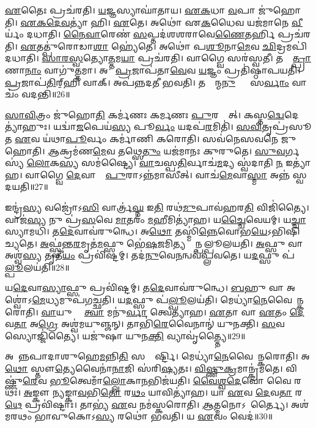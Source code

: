 \ul{𑌏}𑌤𑍈𑌃 𑌪𑍍𑌰𑌚॑𑌰𑌤𑌿।
\ul{𑌯}𑌜𑍍𑌞𑌸𑍍𑌯𑌾𑌘𑌾॑𑌤𑌾𑌯।
\ul{𑌏}\ul{𑌕}𑌧𑌾 \ul{𑌵}𑌪𑌾 𑌜𑍁॑𑌹𑍋𑌤𑌿।
\ul{𑌏}\ul{𑌕}\ul{𑌦𑍇}\ul{𑌵}𑌤𑍍𑌯𑌾॑ 𑌹𑌿।
\ul{𑌏}𑌤𑍇।
𑌅𑌥𑍋॑ 𑌏\ul{𑌕}𑌧𑍈𑌵 𑌯𑌜॑𑌮𑌾𑌨𑍇 \ul{𑌵𑍀}𑌰𑍍𑌯𑌂॑ 𑌦𑌧𑌾𑌤𑌿।
\ul{𑌨𑍈}\ul{𑌵𑌾}𑌰𑍇𑌣॑ \ul{𑌸}𑌪𑍍𑌤𑌦॑𑌶𑌶𑌰𑌾𑌵𑍇\ul{𑌣𑍈}𑌤𑌰𑍍\mbox{}\ul{𑌹𑌿} 𑌪𑍍𑌰𑌚॑𑌰𑌤𑌿।
\ul{𑌏}𑌤𑌤𑍍𑌪𑍁॑𑌰𑍋𑌡𑌾\ul{𑌶𑌾} 𑌹𑍍𑌯𑍇॑𑌤𑍇।
𑌅𑌥𑍋॑ 𑌪\ul{𑌶𑍂}𑌨𑌾\ul{𑌮𑍇}𑌵 \ul{𑌛𑌿}𑌦𑍍𑌰𑌮𑌪𑌿॑𑌦𑌧𑌾𑌤𑌿।
\ul{𑌸𑌾}\ul{𑌰}\ul{𑌸𑍍𑌵}𑌤𑍍𑌯𑍋\ul{𑌤𑍍𑌤}𑌮\ul{𑌯𑌾} 𑌪𑍍𑌰𑌚॑𑌰𑌤𑌿।
𑌵𑌾𑌗𑍍𑌵𑍈 𑌸𑌰॑𑌸𑍍𑌵𑌤𑍀।
𑌤𑌸𑍍𑌮𑌾᳚\ul{𑌤𑍍𑌪𑍍𑌰𑌾}𑌣𑌾\ul{𑌨𑌾𑌂} 𑌵𑌾𑌗𑍁॑\ul{𑌤𑍍𑌤}𑌮𑌾।
𑌅𑌥𑍋᳚ \ul{𑌪𑍍𑌰}𑌜𑌾𑌪॑𑌤𑌾\ul{𑌵𑍇}𑌵 \ul{𑌯}𑌜𑍍𑌞𑌂 𑌪𑍍𑌰𑌤𑌿॑\-𑌷𑍍𑌠𑌾𑌪𑌯𑌤𑌿।
\ul{𑌪𑍍𑌰}𑌜𑌾𑌪॑\ul{𑌤𑌿}𑌰𑍍‌॒\mbox{}𑌹𑌿 𑌵𑌾𑌕𑍍।
𑌅𑌪॑𑌨𑍍𑌨𑌦𑌤𑍀 𑌭𑌵𑌤𑌿।
𑌤𑌸𑍍𑌮𑌾᳚𑌨𑍍𑌮\ul{𑌨𑍁}𑌷𑍍𑌯𑌾𑌃᳚ 𑌸\ul{𑌰𑍍𑌵𑌾𑌂} 𑌵𑌾𑌚𑌂॑ 𑌵𑌦𑌨𑍍𑌤𑌿॥26॥\anuvakamend[\ul{𑌅}\ul{𑌤𑌿}\ul{𑌰𑌾}𑌤𑍍𑌰\ul{𑌮}𑌨𑍍𑌤𑌰𑌿॑𑌕𑍍𑌷\ul{𑌮𑍁}𑌕𑍍𑌥𑍍𑌯𑍇॑𑌨 \ul{𑌪𑍍𑌰}𑌜𑌾𑌪॑𑌤𑌿𑌃 𑌶𑌮\ul{𑌯𑌿}𑌤𑍍𑌵𑍋\ul{𑌤𑍍𑌤}𑌮\ul{𑌯𑌾} 𑌪𑍍𑌰𑌚॑𑌰\ul{𑌤𑌿} 𑌷𑌟𑍍 𑌚॑]

\ul{𑌸𑌾}\ul{𑌵𑌿}𑌤𑍍𑌰𑌂 𑌜𑍁॑𑌹𑍋\ul{𑌤𑌿} 𑌕𑌰𑍍𑌮॑𑌣𑌃 𑌕𑌰𑍍𑌮𑌣𑌃 \ul{𑌪𑍁}𑌰𑌸𑍍𑌤𑌾᳚𑌤𑍍।
𑌕𑌸𑍍𑌤\ul{𑌦𑍍𑌵𑍇}𑌦𑍇𑌤𑍍𑌯𑌾॑𑌹𑍁𑌃।
𑌯𑌦𑍍𑌵𑌾॑\ul{𑌜}𑌪𑍇𑌯॑\ul{𑌸𑍍𑌯} 𑌪𑍂\ul{𑌰𑍍𑌵𑌂} 𑌯𑌦𑌪॑\ul{𑌰}𑌮𑌿𑌤𑌿॑।
\ul{𑌸}\ul{𑌵𑌿}𑌤𑍃𑌪𑍍𑌰॑𑌸𑍂𑌤 \ul{𑌏}𑌵 𑌯॑𑌥𑌾\ul{𑌪𑍂}𑌰𑍍𑌵𑌂 𑌕𑌰𑍍𑌮𑌾॑𑌣𑌿 𑌕𑌰𑍋𑌤𑌿।
𑌸𑌵॑𑌨𑍇𑌸𑌵𑌨𑍇 𑌜𑍁𑌹𑍋𑌤𑌿।
\ul{𑌆}𑌕𑍍𑌰𑌮॑𑌣\ul{𑌮𑍇}𑌵 𑌤𑌥𑍍𑌸𑍇\ul{𑌤𑍁𑌂} 𑌯𑌜॑𑌮𑌾𑌨𑌃 𑌕𑍁𑌰𑍁𑌤𑍇।
\ul{𑌸𑍁}\ul{𑌵}𑌰𑍍𑌗𑌸𑍍𑌯॑ \ul{𑌲𑍋}𑌕\ul{𑌸𑍍𑌯} 𑌸𑌮॑𑌷𑍍𑌟𑍍𑌯𑍈।
\ul{𑌵𑌾}𑌚𑌸𑍍𑌪\ul{𑌤𑌿}𑌰𑍍𑌵𑌾𑌚॑\ul{𑌮}𑌦𑍍𑌯 𑌸𑍍𑌵॑𑌦𑌾𑌤𑌿 \ul{𑌨} 𑌇𑌤𑍍𑌯𑌾॑𑌹।
𑌵𑌾𑌗𑍍𑌵𑍈 \ul{𑌦𑍇}𑌵𑌾𑌨𑌾𑌂᳚ \ul{𑌪𑍁}𑌰𑌾\-𑌽𑌨𑍍𑌨॑𑌮𑌾𑌸𑍀𑌤𑍍।
𑌵𑌾𑌚॑\ul{𑌮𑍇}𑌵𑌾\ul{𑌸𑍍𑌮𑌾} 𑌅𑌨𑍍𑌨॑ 𑌸𑍍𑌵𑌦𑌯𑌤𑌿॥27॥

𑌇𑌨𑍍𑌦𑍍𑌰॑\ul{𑌸𑍍𑌯} 𑌵𑌜𑍍𑌰𑍋॑𑌽\ul{𑌸𑌿} 𑌵𑌾𑌰𑍍𑌤𑍍𑌰॑\ul{𑌘𑍍𑌨} 𑌇\ul{𑌤𑌿} 𑌰𑌥॑\ul{𑌮𑍁}𑌪𑌾𑌵॑𑌹𑌰\ul{𑌤𑌿} 𑌵𑌿𑌜𑌿॑𑌤𑍍𑌯𑍈।
𑌵𑌾𑌜॑\ul{𑌸𑍍𑌯} 𑌨𑍁 𑌪𑍍𑌰॑\ul{𑌸}𑌵𑍇 \ul{𑌮𑌾}𑌤𑌰𑌂॑ \ul{𑌮}𑌹𑍀𑌮𑌿𑌤𑍍𑌯𑌾॑𑌹।
𑌯\ul{𑌚𑍍𑌚𑍈}𑌵𑍇𑌯𑌮𑍍।
𑌯\ul{𑌚𑍍𑌚𑌾}𑌸𑍍𑌯𑌾𑌮𑌧𑌿॑।
𑌤\ul{𑌦𑍇}𑌵𑌾𑌵॑𑌰𑍁𑌨𑍍𑌧𑍇।
𑌅\ul{𑌥𑍋} 𑌤𑌸𑍍𑌮𑌿॑\ul{𑌨𑍍𑌨𑍇}𑌵𑍋𑌭\ul{𑌯𑍇}\-𑌽𑌭𑌿\-𑌷𑌿॑𑌚𑍍𑌯𑌤𑍇।
\ul{𑌅}𑌫𑍍𑌸𑍍𑌵॑𑌨𑍍𑌤\ul{𑌰}𑌮𑍃𑌤॑\ul{𑌮}𑌫𑍍𑌸𑍁 𑌭𑍇॑\ul{𑌷}𑌜𑌮𑌿𑌤𑍍𑌯𑌶𑍍𑌵𑌾᳚𑌨𑍍𑌪𑌲𑍍𑌪𑍂𑌲𑌯𑌤𑌿।
\ul{𑌅}𑌫𑍍𑌸𑍁 𑌵𑌾 𑌅𑌶𑍍𑌵॑\ul{𑌸𑍍𑌯} 𑌤𑍃𑌤𑍀॑\ul{𑌯𑌂} 𑌪𑍍𑌰𑌵𑌿॑𑌷𑍍𑌟𑌮𑍍।
𑌤𑌦॑\ul{𑌨𑍁}𑌵𑍇\ul{𑌨}𑌨𑍍𑌵𑌵॑𑌪𑍍𑌲𑌵𑌤𑍇।
𑌯\ul{𑌦}𑌫𑍍𑌸𑍁 𑌪॑\ul{𑌲𑍍𑌪𑍂}𑌲𑌯॑𑌤𑌿॥28॥

𑌯\ul{𑌦𑍇}𑌵𑌾\ul{𑌸𑍍𑌯𑌾}𑌫𑍍𑌸𑍁 𑌪𑍍𑌰𑌵𑌿॑𑌷𑍍𑌟𑌮𑍍।
𑌤\ul{𑌦𑍇}𑌵𑌾𑌵॑𑌰𑍁𑌨𑍍𑌧𑍇।
\ul{𑌬}𑌹𑍁 𑌵𑌾 𑌅𑌶𑍍𑌵𑍋॑\-𑌽\ul{𑌮𑍇}𑌧𑍍𑌯𑌮𑍁𑌪॑\-𑌗𑌚𑍍𑌛𑌤𑌿।
𑌯\ul{𑌦}𑌫𑍍𑌸𑍁 𑌪॑\ul{𑌲𑍍𑌪𑍂}𑌲𑌯॑𑌤𑌿।
𑌮𑍇𑌧𑍍𑌯𑌾॑\ul{𑌨𑍇}𑌵𑍈\-𑌨𑌾᳚𑌨𑍍𑌕𑌰𑍋𑌤𑌿।
\ul{𑌵𑌾}𑌯𑍁𑌰𑍍𑌵𑌾᳚ \ul{𑌤𑍍𑌵𑌾} 𑌮𑌨𑍁॑\ul{𑌰𑍍𑌵𑌾} 𑌤𑍍𑌵𑍇𑌤𑍍𑌯𑌾॑𑌹।
\ul{𑌏}𑌤𑌾 𑌵𑌾 \ul{𑌏}𑌤𑌂 \ul{𑌦𑍇}𑌵\ul{𑌤𑌾} 𑌅\ul{𑌗𑍍𑌰𑍇} 𑌅𑌶𑍍𑌵॑𑌮𑌯𑍁𑌞𑍍𑌜𑌨𑍍।
𑌤𑌾𑌭𑌿॑\ul{𑌰𑍇}𑌵𑍈𑌨𑌾𑌨𑍍॑ 𑌯𑍁𑌨𑌕𑍍𑌤𑌿।
\ul{𑌸}𑌵𑌸𑍍𑌯𑍋𑌜𑍍𑌜𑌿॑𑌤𑍍𑌯𑍈।
𑌯𑌜𑍁॑𑌷𑌾 𑌯𑍁𑌨\ul{𑌕𑍍𑌤𑌿} 𑌵𑍍𑌯𑌾𑌵𑍃॑𑌤𑍍𑌤𑍍𑌯𑍈॥29॥

𑌅𑌪𑌾᳚𑌨𑍍𑌨𑌪𑌾𑌦𑌾𑌶𑍁𑌹𑍇\ul{𑌮}𑌨𑍍𑌨𑌿\ul{𑌤𑌿} 𑌸𑌮𑍍𑌮𑌾᳚𑌰𑍍𑌷𑍍𑌟𑌿।
𑌮𑍇𑌧𑍍𑌯𑌾॑\ul{𑌨𑍇}𑌵𑍈𑌨𑌾᳚𑌨𑍍𑌕𑌰𑍋𑌤𑌿।
𑌅\ul{𑌥𑍋} 𑌸𑍍𑌤𑍗\ul{𑌤𑍍𑌯𑍇}𑌵𑍈𑌨𑌾॑\ul{𑌨𑌾}𑌜𑌿 𑌸॑𑌰𑌿\ul{𑌷𑍍𑌯}𑌤𑌃।
\ul{𑌵𑌿}\ul{𑌷𑍍𑌣𑍁}\ul{𑌕𑍍𑌰}𑌮𑌾𑌨𑍍𑌕𑍍𑌰॑𑌮𑌤𑍇।
𑌵𑌿𑌷𑍍𑌣𑍁॑\ul{𑌰𑍇}𑌵 \ul{𑌭𑍂}𑌤𑍍𑌵𑍇𑌮𑌾𑌁\ul{𑌲𑍍𑌲𑍋}𑌕𑌾\ul{𑌨}𑌭𑌿𑌜॑𑌯𑌤𑌿।
\ul{𑌵𑍈}\ul{𑌶𑍍𑌵}\ul{𑌦𑍇}𑌵𑍋 𑌵𑍈 𑌰𑌥𑌃॑।
\ul{𑌅}𑌙𑍍𑌕𑍗 \ul{𑌨𑍍𑌯}𑌙𑍍𑌕𑌾\ul{𑌵}𑌭𑌿\ul{𑌤𑍋} 𑌰\ul{𑌥𑌂} 𑌯𑌾𑌵𑌿𑌤𑍍𑌯𑌾॑𑌹।
𑌯𑌾 \ul{𑌏}𑌵 \ul{𑌦𑍇}𑌵\ul{𑌤𑌾} 𑌰\ul{𑌥𑍇} 𑌪𑍍𑌰𑌵𑌿॑𑌷𑍍𑌟𑌾𑌃।
𑌤𑌾𑌭𑍍𑌯॑ \ul{𑌏}𑌵 𑌨𑌮॑𑌸𑍍𑌕𑌰𑍋𑌤𑌿।
\ul{𑌆}𑌤𑍍𑌮𑌨𑍋\-𑌽𑌨𑌾᳚𑌰𑍍𑌤𑍍𑌯𑍈।
𑌅𑌶॑𑌮𑌰𑌥𑌂 𑌭𑌾𑌵𑍁𑌕𑍋\-𑌽\ul{𑌸𑍍𑌯} 𑌰𑌥𑍋॑ 𑌭𑌵𑌤𑌿।
𑌯 \ul{𑌏}𑌵𑌂 𑌵𑍇𑌦॑॥30॥\anuvakamend[\ul{𑌸𑍍𑌵}\ul{𑌦}\ul{𑌯}\ul{𑌤𑌿} \ul{𑌪}\ul{𑌲𑍍𑌪𑍂}𑌲𑌯॑\ul{𑌤𑌿} 𑌵𑍍𑌯𑌾𑌵𑍃॑\ul{𑌤𑍍𑌤𑍍𑌯𑌾} 𑌅𑌨𑌾᳚\ul{𑌰𑍍𑌤𑍍𑌯𑍈} 𑌦𑍍𑌵𑍇 𑌚॑]

